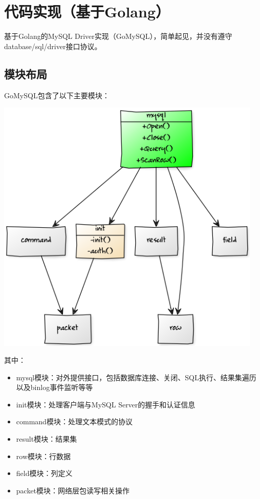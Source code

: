 \documentclass[a4paper, titlepage, 10pt, bookmark]{article}
\begin{document}
\newpage











\section{代码实现（基于Golang）}
基于Golang的MySQL Driver实现（GoMySQL），简单起见，并没有遵守database/sql/driver接口协议。

\subsection{模块布局}
GoMySQL包含了以下主要模块：
\begin{center}
\includegraphics[width=5in]{016.png}
\end{center}

其中：
\begin{itemize}
    \item mysql模块：对外提供接口，包括数据库连接、关闭、SQL执行、结果集遍历以及binlog事件监听等等
    \item init模块：处理客户端与MySQL Server的握手和认证信息
    \item command模块：处理文本模式的协议
    \item result模块：结果集
    \item row模块：行数据
    \item field模块：列定义
    \item packet模块：网络层包读写相关操作
\end{itemize}
\end{document}
